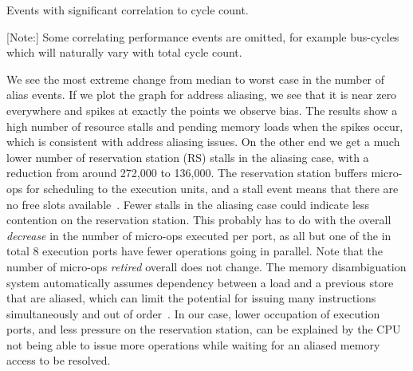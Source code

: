 \documentclass{acm_proc_article-sp}
\newcommand{\perfctr}[1] {
  {\lowercase{#1}}
}
\begin{document}
\begin{table}
  \caption{Events with significant correlation to cycle count.\label{tab:loopcorrelation}}{
    \pgfplotstabletypeset[
      int detect, %
      col sep=comma,
      columns={Performance counter, Median, [index]3, [index]4},
      column type=r,
      columns/Performance counter/.style={
        string type, 
        column type=l,
        column type/.add={|}{},
        postproc cell content/.append code={
          \pgfkeysalso{@cell content=\perfctr{##1}}
        }
      },
      every head row/.style={
        output empty row,
        before row={\hline
          Performance counter & Median & Spike 1 & Spike 2 \\
        },
        after row=\hline\hline
      },
      every last row/.style={after row=\hline},
      every last column/.style={column type/.add={}{|}}
    ]{bin/microkernel-comparison-haswell.csv}
  }
    {[Note:] Some correlating performance events are omitted, for example bus-cycles which will naturally vary with total cycle count.}
\end{table}

We see the most extreme change from median to worst case in the number of alias events. 
If we plot the graph for address aliasing, we see that it is near zero everywhere and spikes at exactly the points we observe bias. 
The results show a high number of resource stalls and pending memory loads when the spikes occur, which is consistent with address aliasing issues.
On the other end we get a much lower number of reservation station (RS) stalls in the aliasing case, with a reduction from around 272,000 to 136,000.
The reservation station buffers micro-ops for scheduling to the execution units, and a stall event means that there are no free slots available~\cite[Table 19-2]{Volume3B}.
Fewer stalls in the aliasing case could indicate less contention on the reservation station.
This probably has to do with the overall \emph{decrease} in the number of micro-ops executed per port, as all but one of the in total 8 execution ports have fewer operations going in parallel.
Note that the number of micro-ops \emph{retired} overall does not change.
The memory disambiguation system automatically assumes dependency between a load and a previous store that are aliased, which can limit the potential for issuing many instructions simultaneously and out of order~\cite[Page 2-20]{OptimizationManual}.
In our case, lower occupation of execution ports, and less pressure on the reservation station, can be explained by the CPU not being able to issue more operations while waiting for an aliased memory access to be resolved.
\end{document}
